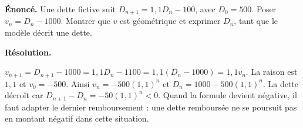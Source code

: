 \documentclass[11pt,a4paper]{article}
\begin{document}
\par\noindent\begin{minipage}{\linewidth}
{\small\color{Muted}\textbf{Énoncé.} Une dette fictive suit $D_{n+1}=1,1D_n-100$, avec $D_0=500$. Poser $v_n=D_n-1000$. Montrer que $v$ est géométrique et exprimer $D_n$, tant que le modèle décrit une dette.}
\par\medskip
\textbf{Résolution.}\par
$v_{n+1}=D_{n+1}-1000=1,1D_n-1100=1,1(D_n-1000)=1,1v_n$. La raison est $1,1$ et $v_0=-500$. Ainsi $v_n=-500(1,1)^n$ et $D_n=1000-500(1,1)^n$. La dette décroît car $D_{n+1}-D_n=-50(1,1)^n<0$. Quand la formule devient négative, il faut adapter le dernier remboursement : une dette remboursée ne se poursuit pas en montant négatif dans cette situation.
\end{minipage}\par
\end{document}
